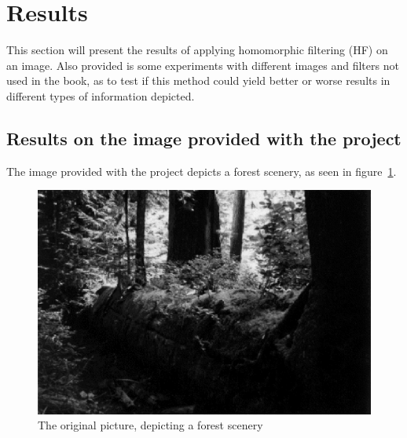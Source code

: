 % 


\section{Results}
	This section will present the results of applying homomorphic filtering (HF)
	on an image. Also provided is some experiments with different images
	and filters not used in the book, as to test if this method could yield
	better or worse results in different types of information depicted.
	\subsection{Results on the image provided with the project}
		The image provided with the project depicts a forest scenery, %
		as seen in figure~\ref{fig:original}.
		\begin{figure}[h!]
			\centering
			\includegraphics[width=0.6\linewidth]{pics/orig_pic.png}
			\caption{The original picture, depicting a forest scenery}
			\label{fig:original}		
		\end{figure}		
		
		
